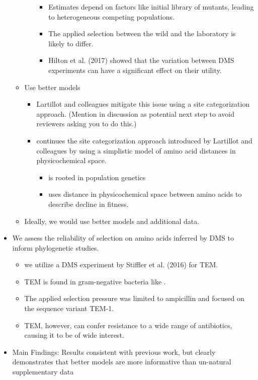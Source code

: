 \documentclass[12pt]{article}
\begin{document}
\begin{itemize}
\begin{itemize}
\begin{itemize}
\begin{itemize}
				\item Estimates depend on factors like initial library of mutants, leading to heterogeneous competing populations.
				\item The applied selection between the wild and the laboratory is likely to differ.
				\item Hilton et al. (2017) showed that the variation between DMS experiments can have a significant effect on their utility.
			\end{itemize}
		\end{itemize}
		\item Use better models
		\begin{itemize}
			\item Lartillot and colleagues mitigate this issue using a site categorization approach. (Mention in discussion as potential next step to avoid reviewers asking you to do this.)
			\item \selac continues the site categorization approach introduced by Lartillot and colleagues by using a simplistic model of amino acid distances in physicochemical space.
			\begin{itemize}
				\item \selac is rooted in population genetics
				\item \selac uses distance in physicochemical space between amino acids to describe decline in fitness.
			\end{itemize}        
		\end{itemize}
		\item Ideally, we would use better models and additional data.
	\end{itemize}
	\item We assess the reliability of selection on amino acids inferred by DMS to inform phylogenetic studies.
	\begin{itemize}
		\item we utilize a DMS experiment by Stiffler et al. (2016) for TEM.
		\item TEM is found in gram-negative bacteria like \ecoli.
		\item The applied selection pressure was limited to ampicillin and focused on the sequence variant TEM-1.
		\item TEM, however, can confer resistance to a wide range of antibiotics, causing it to be of wide interest.
	\end{itemize}
      \item Main Findings: Results consistent with previous work, but clearly demonstrates that better models are more informative than un-natural supplementary data        

\end{itemize}
\end{document}

